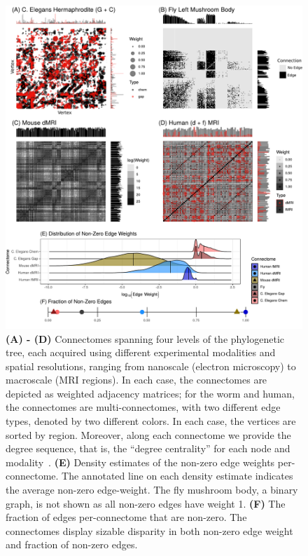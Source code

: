 \documentclass[11pt]{article}
\begin{document}
\begin{figure}
	\begin{center}\includegraphics[width=0.8\linewidth]{figs/fig_connectomes.pdf}\end{center}
	\caption{\textbf{(A) - (D)} Connectomes spanning four levels of the phylogenetic tree, each acquired using different experimental modalities and spatial resolutions, ranging from nanoscale (electron microscopy) to macroscale (MRI regions).  In each case, the connectomes are depicted as weighted adjacency matrices; for the worm and human, the connectomes are multi-connectomes, with two different edge types, denoted by two different colors. In each case, the vertices are sorted by region.  Moreover, along each connectome we provide the degree sequence, that is, the ``degree centrality'' for each node and modality~\cite{Zuo2012-gm}. \textbf{(E)} Density estimates of the non-zero edge weights per-connectome. The annotated line on each density estimate indicates the average non-zero edge-weight. The fly mushroom body, a binary graph, is not shown as all non-zero edges have weight 1. \textbf{(F)} The fraction of edges per-connectome that are non-zero. The connectomes display sizable disparity in both non-zero edge weight and fraction of non-zero edges.}
	\label{f:connectomes}
\end{figure}
\end{document}
